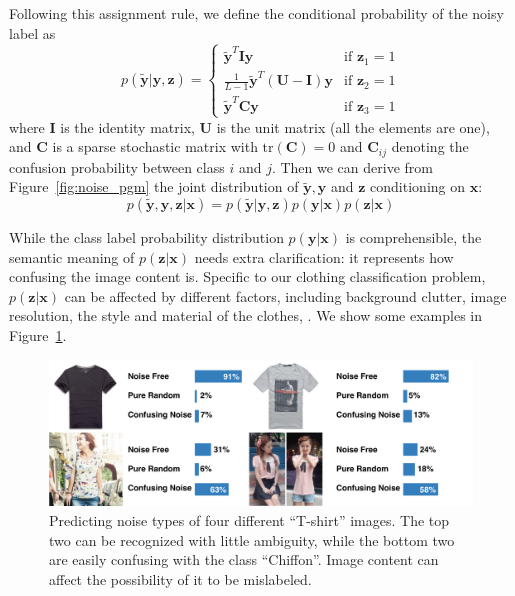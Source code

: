 \documentclass[10pt,twocolumn,letterpaper]{article}
\def\vec{\mathbf}
\def\mat{\mathbf}
\begin{document}
Following this assignment rule, we define the conditional probability of the noisy label as
\begin{equation} \label{eq:likelihood}
    p(\tilde{\vec{y}}|\vec{y},\vec{z}) = \begin{cases}
        \tilde{\vec{y}}^{T}\mat{I}\vec{y} & \text{if } \vec{z}_1 = 1 \\
        \frac{1}{L-1}\tilde{\vec{y}}^{T}(\mat{U} - \mat{I})\vec{y} & \text{if } \vec{z}_2 = 1 \\
        \tilde{\vec{y}}^{T}\mat{C}\vec{y} & \text{if } \vec{z}_3 = 1
    \end{cases}
\end{equation}
where $\mat{I}$ is the identity matrix, $\mat{U}$ is the unit matrix (all the elements are one), and $\mat{C}$ is a sparse stochastic matrix with $\mathrm{tr}(\mat{C})=0$ and $\mat{C}_{ij}$ denoting the confusion probability between class $i$ and $j$. Then we can derive from Figure~\ref{fig:noise_pgm} the joint distribution of $\tilde{\vec{y}}, \vec{y}$ and $\vec{z}$ conditioning on $\vec{x}$:
\begin{equation} \label{eq:joint_distribution}
  p(\tilde{\vec{y}}, \vec{y}, \vec{z} | \vec{x}) = p(\tilde{\vec{y}} | \vec{y}, \vec{z}) p(\vec{y} | \vec{x}) p(\vec{z} | \vec{x})
\end{equation}

While the class label probability distribution $p(\vec{y} | \vec{x})$ is comprehensible, the semantic meaning of $p(\vec{z} | \vec{x})$ needs extra clarification: it represents how confusing the image content is. Specific to our clothing classification problem, $p(\vec{z} | \vec{x})$ can be affected by different factors, including background clutter, image resolution, the style and material of the clothes, \etc. We show some examples in Figure~\ref{fig:compare_noise_level}.

\begin{figure}[t]
\begin{center}
\includegraphics[width=1.0\linewidth]{figure/noise_level.pdf}
\end{center}
\caption{Predicting noise types of four different ``T-shirt'' images. The top two can be recognized with little ambiguity, while the bottom two are easily confusing with the class ``Chiffon''. Image content can affect the possibility of it to be mislabeled.}
\label{fig:compare_noise_level}
\end{figure}
\end{document}
